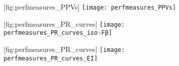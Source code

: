 \begin{figure}
    \begin{sidecaption}
        {}
        [fig:perfmeasures_PPVs]
        \texttt{[image: perfmeasures\_PPVs]}
    \end{sidecaption}
\end{figure}

\begin{figure}
    \begin{sidecaption}
        {}
        [fig:perfmeasures_PR_curves]
        \texttt{[image: perfmeasures\_PR\_curves\_iso-Fβ]}
    \end{sidecaption}
\end{figure}

\begin{figure}
    \begin{sidecaption}
        {}
        [fig:perfmeasures_PR_curves]
        \texttt{[image: perfmeasures\_PR\_curves\_EI]}
    \end{sidecaption}
\end{figure}
